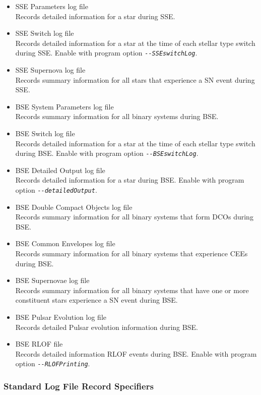 \begin{itemize}
\itemsep0pt
\item{SSE Parameters log file \\ Records detailed information for a star during SSE.}
\item{SSE Switch log file \\ Records detailed information for a star at the time of each stellar type switch during SSE. Enable with program option \textit{\texttt{-{}-{SSEswitchLog}}}.}
\item{SSE Supernova log file \\ Records summary information for all stars that experience a SN event during SSE.}
\item{BSE System Parameters log file \\ Records summary information for all binary systems during BSE.}
\item{BSE Switch log file \\ Records detailed information for a star at the time of each stellar type switch during BSE. Enable with program option \textit{\texttt{-{}-{BSEswitchLog}}}.}
\item{BSE Detailed Output log file \\ Records detailed information for a star during BSE. Enable with program option \textit{\texttt{-{}-{detailedOutput}}}.}
\item{BSE Double Compact Objects log file \\ Records summary information for all binary systems that form DCOs during BSE.}
\item{BSE Common Envelopes log file \\ Records summary information for all binary systems that experience CEEs during BSE.}
\item{BSE Supernovae log file \\ Records summary information for all binary systems that have one or more constituent stars experience a SN event during BSE.}
\item{BSE Pulsar Evolution log file \\ Records detailed Pulsar evolution information during BSE.}
\item{BSE RLOF file \\ Records detailed information RLOF events during BSE. Enable with program option \textit{\texttt{-{}-{RLOFPrinting}}}.}
\end{itemize}

\newpage
\subsubsection{Standard Log File Record Specifiers}\label{sec:StandardLogFileRecordSpecifiers}

